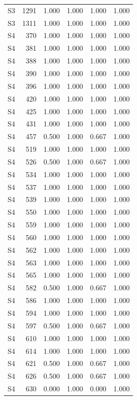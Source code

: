 \begin{tabular}{lrrrrr}
S3 & 1291 & 1.000 & 1.000 & 1.000 & 1.000 \\
S3 & 1311 & 1.000 & 1.000 & 1.000 & 1.000 \\
S4 & 370 & 1.000 & 1.000 & 1.000 & 1.000 \\
S4 & 381 & 1.000 & 1.000 & 1.000 & 1.000 \\
S4 & 388 & 1.000 & 1.000 & 1.000 & 1.000 \\
S4 & 390 & 1.000 & 1.000 & 1.000 & 1.000 \\
S4 & 396 & 1.000 & 1.000 & 1.000 & 1.000 \\
S4 & 420 & 1.000 & 1.000 & 1.000 & 1.000 \\
S4 & 425 & 1.000 & 1.000 & 1.000 & 1.000 \\
S4 & 431 & 1.000 & 1.000 & 1.000 & 1.000 \\
S4 & 457 & 0.500 & 1.000 & 0.667 & 1.000 \\
S4 & 519 & 1.000 & 1.000 & 1.000 & 1.000 \\
S4 & 526 & 0.500 & 1.000 & 0.667 & 1.000 \\
S4 & 534 & 1.000 & 1.000 & 1.000 & 1.000 \\
S4 & 537 & 1.000 & 1.000 & 1.000 & 1.000 \\
S4 & 539 & 1.000 & 1.000 & 1.000 & 1.000 \\
S4 & 550 & 1.000 & 1.000 & 1.000 & 1.000 \\
S4 & 559 & 1.000 & 1.000 & 1.000 & 1.000 \\
S4 & 560 & 1.000 & 1.000 & 1.000 & 1.000 \\
S4 & 562 & 1.000 & 1.000 & 1.000 & 1.000 \\
S4 & 563 & 1.000 & 1.000 & 1.000 & 1.000 \\
S4 & 565 & 1.000 & 1.000 & 1.000 & 1.000 \\
S4 & 582 & 0.500 & 1.000 & 0.667 & 1.000 \\
S4 & 586 & 1.000 & 1.000 & 1.000 & 1.000 \\
S4 & 594 & 1.000 & 1.000 & 1.000 & 1.000 \\
S4 & 597 & 0.500 & 1.000 & 0.667 & 1.000 \\
S4 & 610 & 1.000 & 1.000 & 1.000 & 1.000 \\
S4 & 614 & 1.000 & 1.000 & 1.000 & 1.000 \\
S4 & 621 & 0.500 & 1.000 & 0.667 & 1.000 \\
S4 & 626 & 0.500 & 1.000 & 0.667 & 1.000 \\
S4 & 630 & 0.000 & 1.000 & 0.000 & 1.000 \\

\end{tabular}

